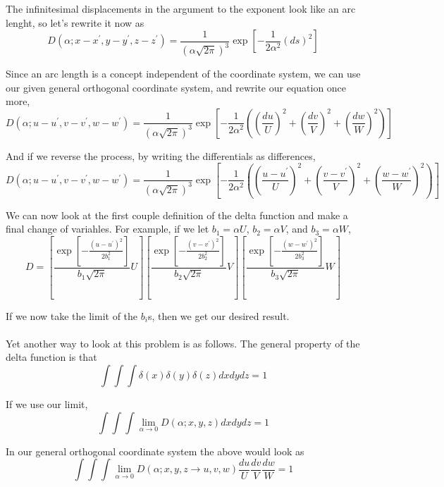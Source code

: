The infinitesimal displacements in the argument to the exponent look like an arc lenght, so let's rewrite it now as
$$
D\left(\alpha ; x-x^\prime, y-y^\prime, z-z^\prime \right) =
    \frac{1}{\left(\alpha \sqrt{2\pi}\right)^3}
    \exp{ \left[ -\frac{1}{2\alpha^2} \left( ds \right)^2 \right] }
$$

Since an arc length is a concept independent of the coordinate system, we can use our given general orthogonal coordinate system,
and rewrite our equation once more,
$$
D\left(\alpha ; u-u^\prime, v-v^\prime, w-w^\prime \right) =
    \frac{1}{\left(\alpha \sqrt{2\pi}\right)^3}
    \exp{ \left[ -\frac{1}{2\alpha^2} \left( 
        \left(\frac{du}{U}\right)^2 + \left(\frac{dv}{V}\right)^2 + \left(\frac{dw}{W}\right)^2 \right) 
    \right] }
$$

And if we reverse the process, by writing the differentials as differences,
$$
D\left(\alpha ; u-u^\prime, v-v^\prime, w-w^\prime \right) =
    \frac{1}{\left(\alpha \sqrt{2\pi}\right)^3}
    \exp{ \left[ -\frac{1}{2\alpha^2} \left(
        \left(\frac{u-u^\prime}{U}\right)^2 + \left(\frac{v-v^\prime}{V}\right)^2 + \left(\frac{w-w^\prime}{W}\right)^2 \right) 
    \right] }
$$

We can now look at the first couple definition of the delta function and make a final change of variahles.
For example, if we let $b_1 = \alpha U$, $b_2 = \alpha V$, and $b_3 = \alpha W$,
$$
D =
    \left[ \frac{
            \exp{ \left[ -\frac{
                \left(u-u^\prime\right)^2
            }{2b_{1}^{2}}  \right] }
        }{b_1 \sqrt{2\pi}}
        U
     \right]
     \left[ \frac{
            \exp{ \left[ -\frac{
                \left(v-v^\prime\right)^2
            }{2b_{2}^{2}}  \right] }
        }{b_2 \sqrt{2\pi}}
        V
     \right]
     \left[ \frac{
            \exp{ \left[ -\frac{
                \left(w-w^\prime\right)^2
            }{2b_{3}^{2}}  \right] }
        }{b_3 \sqrt{2\pi}}
        W
     \right]
$$

If we now take the limit of the $b_i$s, then we get our desired result.
\\~\\

Yet another way to look at this problem is as follows.
The general property of the delta function is that
$$
\int \int \int \delta(x) \delta(y) \delta(z) dx dy dz = 1
$$

If we use our limit,
$$
\int \int \int \lim_{\alpha\rightarrow 0} D(\alpha; x, y, z) dx dy dz = 1
$$

In our general orthogonal coordinate system the above would look as
$$
\int \int \int \lim_{\alpha\rightarrow 0} D(\alpha; x, y, z \rightarrow u, v, w) \frac{du}{U} \frac{dv}{V} \frac{dw}{W} = 1
$$

